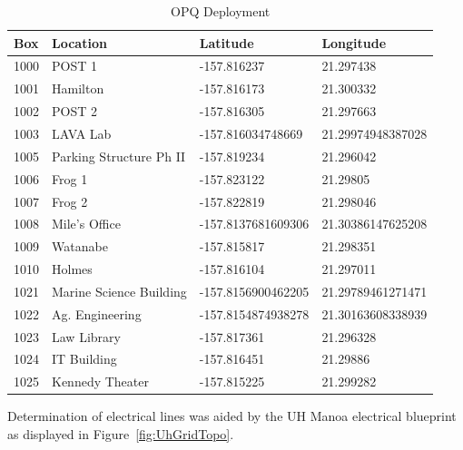 \begin{table}[H]
	\centering
	\caption{OPQ Deployment}
	\begin{tabularx}{\textwidth}{lllX}
		\toprule
		\textbf{Box} & \textbf{Location} & \textbf{Latitude} & \textbf{Longitude} \\
		\midrule
		1000 & POST 1 & -157.816237 & 21.297438 \\
		1001 & Hamilton & -157.816173 & 21.300332 \\
		1002 & POST 2 & -157.816305 & 21.297663 \\
		1003 & LAVA Lab & -157.816034748669 & 21.29974948387028 \\
		1005 & Parking Structure Ph II & -157.819234 & 21.296042 \\
		1006 & Frog 1 & -157.823122 & 21.29805 \\
		1007 & Frog 2 & -157.822819 & 21.298046 \\
		1008 & Mile's Office & -157.8137681609306 & 21.30386147625208 \\
		1009 & Watanabe & -157.815817 & 21.298351 \\
		1010 & Holmes & -157.816104 & 21.297011 \\
		1021 & Marine Science Building & -157.8156900462205 & 21.29789461271471 \\
		1022 & Ag. Engineering & -157.8154874938278 & 21.30163608338939 \\
		1023 & Law Library & -157.817361 & 21.296328 \\
		1024 & IT Building & -157.816451 & 21.29886 \\
		1025 & Kennedy Theater & -157.815225 & 21.299282 \\
		\bottomrule
	\end{tabularx}
	\label{table:OpqDeployment}
\end{table}

Determination of electrical lines was aided by the UH Manoa electrical blueprint as displayed in Figure~\ref{fig:UhGridTopo}.


